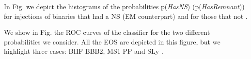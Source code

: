 In Fig. we depict the histograms of the probabilities p(\textit{HasNS}) (p(\textit{HasRemnant})) for injections of binaries that had a NS (EM counterpart) and for those that not .

We show in Fig. the ROC curves of the classifier for the two different probabilities we consider. All the EOS are depicted in this figure, but we highlight three cases: BHF BBB2, MS1 PP and SLy .








    


